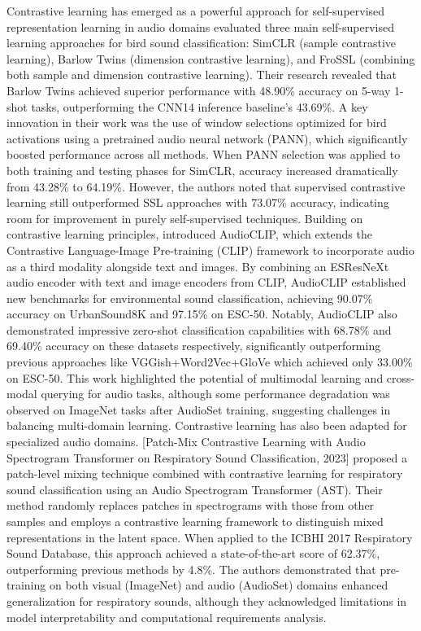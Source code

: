 \documentclass[11pt]{article}
\begin{document}
Contrastive learning has emerged as a powerful approach for self-supervised representation learning in audio domains \citep{moummad2024selfsupervisedlearningfewshotbird} evaluated three main self-supervised learning approaches for bird sound classification: SimCLR (sample contrastive learning), Barlow Twins (dimension contrastive learning), and FroSSL (combining both sample and dimension contrastive learning). Their research revealed that Barlow Twins achieved superior performance with 48.90\% accuracy on 5-way 1-shot tasks, outperforming the CNN14 inference baseline's 43.69\%. A key innovation in their work was the use of window selections optimized for bird activations using a pretrained audio neural network (PANN), which significantly boosted performance across all methods. When PANN selection was applied to both training and testing phases for SimCLR, accuracy increased dramatically from 43.28\% to 64.19\%. However, the authors noted that supervised contrastive learning still outperformed SSL approaches with 73.07\% accuracy, indicating room for improvement in purely self-supervised techniques.
Building on contrastive learning principles, \citep{guzhov2021audioclipextendingclipimage} introduced AudioCLIP, which extends the Contrastive Language-Image Pre-training (CLIP) framework to incorporate audio as a third modality alongside text and images. By combining an ESResNeXt audio encoder with text and image encoders from CLIP, AudioCLIP established new benchmarks for environmental sound classification, achieving 90.07\% accuracy on UrbanSound8K and 97.15\% on ESC-50. Notably, AudioCLIP also demonstrated impressive zero-shot classification capabilities with 68.78\% and 69.40\% accuracy on these datasets respectively, significantly outperforming previous approaches like VGGish+Word2Vec+GloVe which achieved only 33.00\% on ESC-50. This work highlighted the potential of multimodal learning and cross-modal querying for audio tasks, although some performance degradation was observed on ImageNet tasks after AudioSet training, suggesting challenges in balancing multi-domain learning.
Contrastive learning has also been adapted for specialized audio domains. [Patch-Mix Contrastive Learning with Audio Spectrogram Transformer on Respiratory Sound Classification, 2023] proposed a patch-level mixing technique combined with contrastive learning for respiratory sound classification using an Audio Spectrogram Transformer (AST). Their method randomly replaces patches in spectrograms with those from other samples and employs a contrastive learning framework to distinguish mixed representations in the latent space. When applied to the ICBHI 2017 Respiratory Sound Database, this approach achieved a state-of-the-art score of 62.37\%, outperforming previous methods by 4.8\%. The authors demonstrated that pre-training on both visual (ImageNet) and audio (AudioSet) domains enhanced generalization for respiratory sounds, although they acknowledged limitations in model interpretability and computational requirements analysis.
\end{document}
